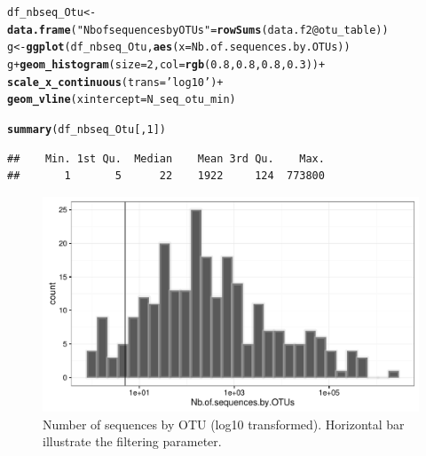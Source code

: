 \documentclass[12pt]{article}\usepackage[]{graphicx}\usepackage[]{color}
\makeatletter
\def\maxwidth{ %
  \ifdim\Gin@nat@width>\linewidth
    \linewidth
  \else
    \Gin@nat@width
  \fi
}
\newcommand{\hlnum}[1]{\textcolor[rgb]{0.686,0.059,0.569}{#1}}%
\newcommand{\hlstr}[1]{\textcolor[rgb]{0.192,0.494,0.8}{#1}}%
\newcommand{\hlopt}[1]{\textcolor[rgb]{0,0,0}{#1}}%
\newcommand{\hlstd}[1]{\textcolor[rgb]{0.345,0.345,0.345}{#1}}%
\newcommand{\hlkwb}[1]{\textcolor[rgb]{0.69,0.353,0.396}{#1}}%
\newcommand{\hlkwc}[1]{\textcolor[rgb]{0.333,0.667,0.333}{#1}}%
\newcommand{\hlkwd}[1]{\textcolor[rgb]{0.737,0.353,0.396}{\textbf{#1}}}%
\newenvironment{kframe}{%
 \def\at@end@of@kframe{}%
 \ifinner\ifhmode%
  \def\at@end@of@kframe{\end{minipage}}%
  \begin{minipage}{\columnwidth}%
 \fi\fi%
 \def\FrameCommand##1{\hskip\@totalleftmargin \hskip-\fboxsep
 \colorbox{shadecolor}{##1}\hskip-\fboxsep
     \hskip-\linewidth \hskip-\@totalleftmargin \hskip\columnwidth}%
 \MakeFramed {\advance\hsize-\width
   \@totalleftmargin\z@ \linewidth\hsize
   \@setminipage}}%
 {\par\unskip\endMakeFramed%
 \at@end@of@kframe}
\newenvironment{knitrout}{}{} %
\numberwithin{figure}{section}
\makeatother
\begin{document}
\begin{knitrout}\small
{}\color{fgcolor}\begin{kframe}
\begin{alltt}
\hlstd{df_nbseq_Otu} \hlkwb{<-} \hlkwd{data.frame}\hlstd{(}\hlstr{"Nb of sequences by OTUs"} \hlstd{=} \hlkwd{rowSums}\hlstd{(data.f2}\hlopt{@}\hlkwc{otu_table}\hlstd{))}
\hlstd{g} \hlkwb{<-} \hlkwd{ggplot}\hlstd{(df_nbseq_Otu,} \hlkwd{aes}\hlstd{(}\hlkwc{x} \hlstd{= Nb.of.sequences.by.OTUs))}
\hlstd{g} \hlopt{+} \hlkwd{geom_histogram}\hlstd{(}\hlkwc{size} \hlstd{=} \hlnum{2}\hlstd{,} \hlkwc{col} \hlstd{=} \hlkwd{rgb}\hlstd{(}\hlnum{0.8}\hlstd{,} \hlnum{0.8}\hlstd{,} \hlnum{0.8}\hlstd{,} \hlnum{0.3}\hlstd{))} \hlopt{+}
  \hlkwd{scale_x_continuous}\hlstd{(}\hlkwc{trans} \hlstd{=} \hlstr{'log10'}\hlstd{)} \hlopt{+}
  \hlkwd{geom_vline}\hlstd{(}\hlkwc{xintercept}\hlstd{= N_seq_otu_min)}
\end{alltt}


{\ttfamily\noindent\itshape\color{messagecolor}{\#\# `stat\_bin()` using `bins = 30`. Pick better value with `binwidth`.}}\begin{alltt}
\hlkwd{summary}\hlstd{(df_nbseq_Otu[,} \hlnum{1}\hlstd{])}
\end{alltt}
\begin{verbatim}
##    Min. 1st Qu.  Median    Mean 3rd Qu.    Max. 
##       1       5      22    1922     124  773800
\end{verbatim}
\end{kframe}\begin{figure}

{\centering \includegraphics[width=\maxwidth]{figure/nbseq_Otu-1} 

}

\caption[Number of sequences by OTU (log10 transformed)]{Number of sequences by OTU (log10 transformed). Horizontal bar illustrate the filtering parameter.}\label{fig:nbseq_Otu}
\end{figure}


\end{knitrout}
\end{document}
